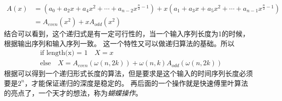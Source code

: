         \begin{equation}
            \begin{split}
                A(x) &= (a_0 + a_2 x + a_4 x^2 + \cdots + a_{n - 2}x^{\frac n 2 - 1}) + x(a_1 + a_3 x + a_5 x^2 + \cdots + a_{n - 1}x^{\frac n 2 - 1})\\
                &= A_{even}(x^2) + xA_{odd}(x^2)
            \end{split} 
            \label{eq: 4.10}
        \end{equation}
        结合可以看到，这个递归式是有一定可行性的，当一个输入序列长度为1的时候，根据输出序列和输入序列一致。%
        这一个特性又可以做递归算法的基础。所以
        \begin{equation}
            \begin{split}
                &\text{if length(x) = 1}\quad X = x\\
                &\text{else}\quad X = A_{even}(\omega(n, 2k)) + \omega(n, k)A_{odd}(\omega(n, 2k))
            \end{split}
            \label{eq: 4.11}
        \end{equation}
        根据可以得到一个递归形式长度的算法，但是要求是这个输入的时间序列长度必须要是$2^n$，才能保证递归的深度是稳定的。%
        再后面的一个操作就是快速傅里叶算法的亮点了，一个天才的想法，称为\emph{蝴蝶操作}。

